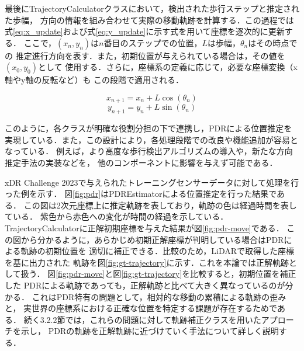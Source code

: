 最後にTrajectoryCalculatorクラスにおいて，検出された歩行ステップと推定された歩幅，
方向の情報を組み合わせて実際の移動軌跡を計算する．この過程では式\ref{eq:x_update}および式\ref{eq:y_update}に示す式を用いて座標を逐次的に更新する．
ここで，$(x_n, y_n)$は$n$番目のステップでの位置，$L$は歩幅，$\theta_n$はその時点での
推定進行方向を表す．また，初期位置が与えられている場合は，その値を$(x_0, y_0)$として
使用する．さらに，座標系の定義に応じて，必要な座標変換（x軸やy軸の反転など）も
この段階で適用される．



\begin{equation}
\label{eq:x_update}
x_{n+1} = x_n + L \cos(\theta_n)
\end{equation}
\begin{equation}
\label{eq:y_update}
y_{n+1} = y_n + L \sin(\theta_n)
\end{equation}


このように，各クラスが明確な役割分担の下で連携し，PDRによる位置推定を
実現している．また，この設計により，各処理段階での改良や機能追加が容易となっている．
例えば，より高度な歩行検出アルゴリズムの導入や，新たな方向推定手法の実装などを，
他のコンポーネントに影響を与えず可能である．


xDR Challenge 2023で与えられたトレーニングセンサーデータに対して処理を行った例を示す．
図\ref{fig:pdr}はPDREstimatorによる位置推定を行った結果である．
この図は2次元座標上に推定軌跡を表しており，軌跡の色は経過時間を表している．
紫色から赤色への変化が時間の経過を示している．
TrajectoryCalculatorに正解初期座標を与えた結果が図\ref{fig:pdr-move}である．
この図から分かるように，あらかじめ初期正解座標が判明している場合はPDRによる軌跡の初期位置を
適切に補正できる．比較のため，LiDARで取得した座標を基に出力された
軌跡を図\ref{fig:gt-trajectory}に示す．これを本論では正解軌跡として扱う．
図\ref{fig:pdr-move}と図\ref*{fig:gt-trajectory}を比較すると，初期位置を補正した
PDRによる軌跡であっても，正解軌跡と比べて大きく異なっているのが分かる．
これはPDR特有の問題として，相対的な移動の累積による軌跡の歪みと，
実世界の座標系における正確な位置を特定する課題が存在するためである．
続く3.2.2節では，これらの問題に対して軌跡補正クラスを用いたアプローチを示し，
PDRの軌跡を正解軌跡に近づけていく手法について詳しく説明する．



